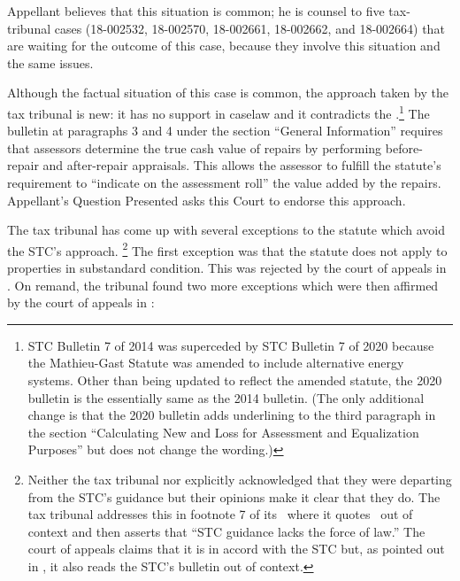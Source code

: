 \documentclass[12pt,\documentclassflag]{michiganCourtOfAppealsBrief}
\begin{document}


Appellant believes that this situation is common; he is counsel to five tax-tribunal cases (18-002532, 18-002570, 18-002661, 18-002662, and 18-002664) that are waiting for the outcome of this case, because they involve this situation and the same issues.%

Although the factual situation of this case is common, the approach taken by the tax tribunal is new: it has no support in caselaw and it contradicts the \cite{STC Bulletin 7 of 2014}.\footnote{STC Bulletin 7 of 2014 was superceded by STC Bulletin 7 of 2020 because the Mathieu-Gast Statute was amended to include alternative energy systems. Other than being updated to reflect the amended statute, the 2020 bulletin is the essentially same as the 2014 bulletin. (The only additional change is that the 2020 bulletin adds underlining to the third paragraph in the section ``Calculating New and Loss for Assessment and Equalization Purposes'' but does not change the wording.)} The bulletin at paragraphs 3 and 4 under the section ``General Information'' requires that assessors  determine the true cash value of repairs by performing before-repair and after-repair appraisals. This allows the assessor to fulfill the statute's requirement to ``indicate on the assessment roll'' the value added by the repairs. Appellant's Question Presented asks this Court to endorse this approach. 

The tax tribunal has come up with several exceptions to the statute which avoid the STC's approach.%
\footnote{Neither the tax tribunal nor explicitly acknowledged that they were departing from the STC's guidance but their opinions make it clear that they do. The tax tribunal addresses this in footnote 7 of its \cite{Tribunal's Denial of Reconsideration 2}\ where it quotes \cite{STC Bulletin 7 of 2014}\ out of context and then asserts that ``STC guidance lacks the force of law.'' The court of appeals claims that it is in accord with the STC but, as pointed out in
  , it also reads the STC's bulletin out of context.}
The first exception was that the statute does not apply to properties in substandard condition. This was rejected by the court of appeals in \cite{Patru I}. On remand, the tribunal found two more exceptions which were then affirmed by the court of appeals in \cite{Patru II}:
\end{document}
